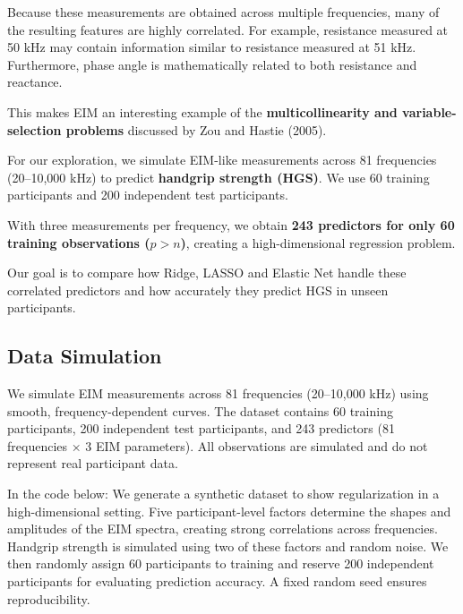 \documentclass[
  letterpaper,
  DIV=11,
  numbers=noendperiod]{scrreprt}
\begin{document}
Because these measurements are obtained across multiple frequencies,
many of the resulting features are highly correlated. For example,
resistance measured at 50 kHz may contain information similar to
resistance measured at 51 kHz. Furthermore, phase angle is
mathematically related to both resistance and reactance.

This makes EIM an interesting example of the \textbf{multicollinearity
and variable-selection problems} discussed by Zou and Hastie (2005).

For our exploration, we simulate EIM-like measurements across 81
frequencies (20--10,000 kHz) to predict \textbf{handgrip strength
(HGS)}. We use 60 training participants and 200 independent test
participants.

With three measurements per frequency, we obtain \textbf{243 predictors
for only 60 training observations (\(p>n\))}, creating a
high-dimensional regression problem.

Our goal is to compare how Ridge, LASSO and Elastic Net handle these
correlated predictors and how accurately they predict HGS in unseen
participants.

\subsection{Data Simulation}\label{data-simulation}

We simulate EIM measurements across 81 frequencies (20--10,000 kHz)
using smooth, frequency-dependent curves. The dataset contains 60
training participants, 200 independent test participants, and 243
predictors (81 frequencies × 3 EIM parameters). All observations are
simulated and do not represent real participant data.

In the code below: We generate a synthetic dataset to show
regularization in a high-dimensional setting. Five participant-level
factors determine the shapes and amplitudes of the EIM spectra, creating
strong correlations across frequencies. Handgrip strength is simulated
using two of these factors and random noise. We then randomly assign 60
participants to training and reserve 200 independent participants for
evaluating prediction accuracy. A fixed random seed ensures
reproducibility.
\end{document}
